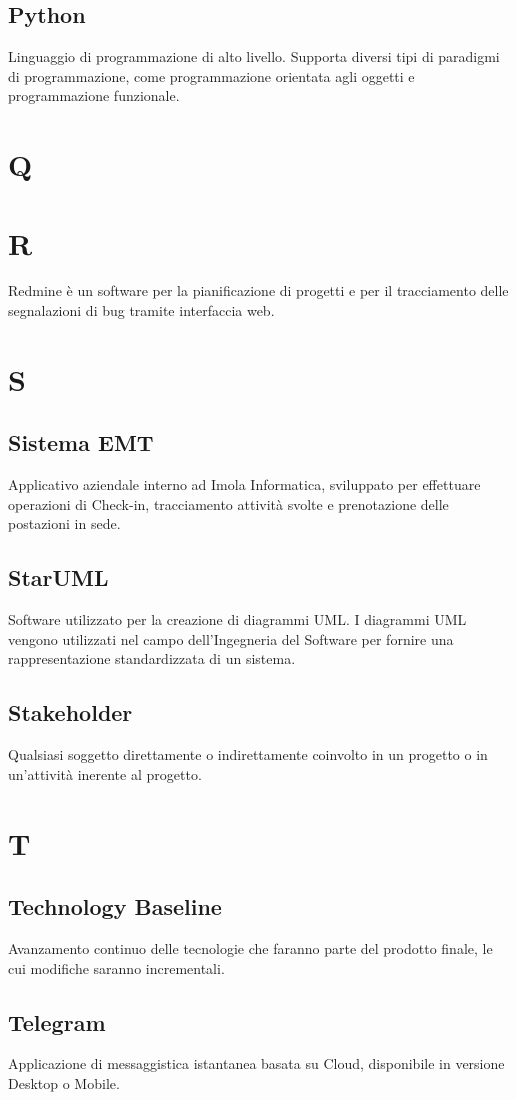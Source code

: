 \subsection{Python}
Linguaggio di programmazione di alto livello. Supporta diversi tipi di paradigmi di programmazione, come programmazione
orientata agli oggetti e programmazione funzionale.
\newpage
\section{Q}
\section{R}
Redmine è un software per la pianificazione di progetti e per il tracciamento delle segnalazioni di bug tramite interfaccia web.
\newpage
\section{S}
\subsection{Sistema EMT}
Applicativo aziendale interno ad Imola Informatica, sviluppato per effettuare operazioni di Check-in, tracciamento attività svolte e prenotazione delle postazioni in sede.
\subsection{StarUML}
Software utilizzato per la creazione di diagrammi UML. I diagrammi UML vengono utilizzati nel campo dell'Ingegneria del Software per fornire una rappresentazione standardizzata di un sistema.
\subsection{Stakeholder}
Qualsiasi soggetto direttamente o indirettamente coinvolto in un progetto o in un'attività inerente al progetto.
\newpage
\section{T}
\subsection{Technology Baseline}
Avanzamento continuo delle tecnologie che faranno parte del prodotto finale, le cui modifiche saranno incrementali.
\subsection{Telegram}
Applicazione di messaggistica istantanea basata su Cloud, disponibile in versione Desktop o Mobile.
